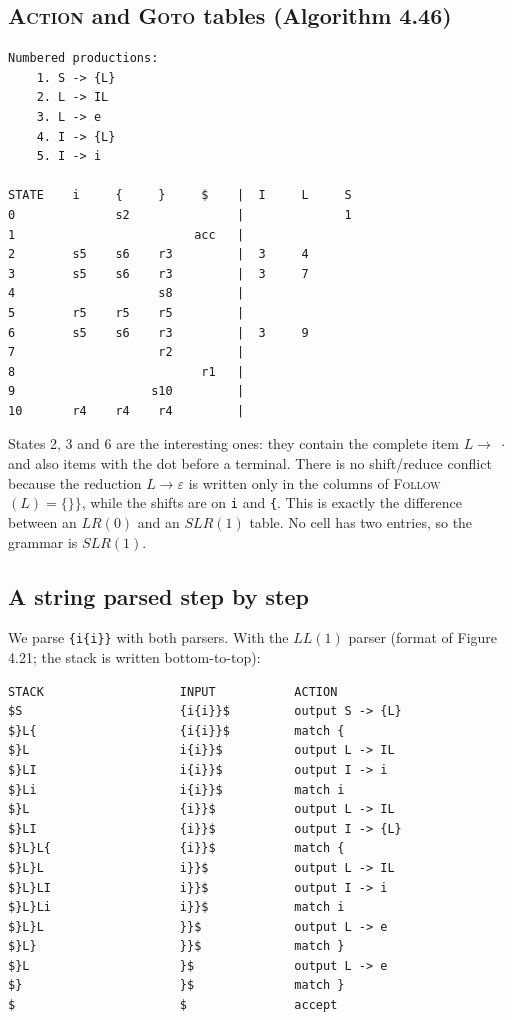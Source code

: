 \documentclass[11pt]{article}
\newcommand{\follow}{\textsc{Follow}}
\newcommand{\gotofn}{\textsc{Goto}}
\begin{document}
\subsection{\textsc{Action} and \gotofn{} tables (Algorithm 4.46)}

\begin{center}
\small
\begin{verbatim}
Numbered productions:
    1. S -> {L}
    2. L -> IL
    3. L -> e
    4. I -> {L}
    5. I -> i

STATE    i     {     }     $    |  I     L     S
0              s2               |              1
1                         acc   |
2        s5    s6    r3         |  3     4
3        s5    s6    r3         |  3     7
4                    s8         |
5        r5    r5    r5         |
6        s5    s6    r3         |  3     9
7                    r2         |
8                          r1   |
9                   s10         |
10       r4    r4    r4         |
\end{verbatim}
\end{center}

States 2, 3 and 6 are the interesting ones: they contain the complete item
$L \rightarrow \;\cdot$ and also items with the dot before a terminal. There is no
shift/reduce conflict because the reduction $L \rightarrow \varepsilon$ is written only
in the columns of \follow{}$(L) = \{\texttt{\}}\}$, while the shifts are on \texttt{i}
and \texttt{\{}. This is exactly the difference between an $LR(0)$ and an $SLR(1)$
table. No cell has two entries, so the grammar is $SLR(1)$.

\subsection{A string parsed step by step}

We parse \texttt{\{i\{i\}\}} with both parsers. With the $LL(1)$ parser (format of
Figure 4.21; the stack is written bottom-to-top):

\begin{center}
\small
\begin{verbatim}
STACK                   INPUT           ACTION
$S                      {i{i}}$         output S -> {L}
$}L{                    {i{i}}$         match {
$}L                     i{i}}$          output L -> IL
$}LI                    i{i}}$          output I -> i
$}Li                    i{i}}$          match i
$}L                     {i}}$           output L -> IL
$}LI                    {i}}$           output I -> {L}
$}L}L{                  {i}}$           match {
$}L}L                   i}}$            output L -> IL
$}L}LI                  i}}$            output I -> i
$}L}Li                  i}}$            match i
$}L}L                   }}$             output L -> e
$}L}                    }}$             match }
$}L                     }$              output L -> e
$}                      }$              match }
$                       $               accept
\end{verbatim}
\end{center}
\end{document}
